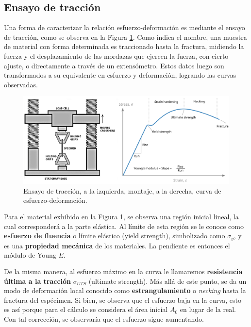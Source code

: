\subsection{Ensayo de tracción}

Una forma de caracterizar la relación esfuerzo-deformación es mediante el ensayo de tracción, como se observa en la Figura \ref{fig:2}. Como indica el nombre, una muestra de material con forma determinada es traccionado hasta la fractura, midiendo la fuerza y el desplazamiento de las mordazas que ejercen la fuerza, con cierto ajuste, o directamente a través de un extensómetro. Estos datos luego son transformados a su equivalente en esfuerzo y deformación, logrando las curvas observadas. 

\begin{figure}[h!]
    \centering
    \includegraphics[width=0.92\linewidth]{imgs/es1.png}
    \caption{Ensayo de tracción, a la izquierda, montaje, a la derecha, curva de esfuerzo-deformación.}
    \label{fig:2}
\end{figure}

Para el material exhibido en la Figura \ref{fig:2}, se observa una región inicial lineal, la cual corresponderá a la parte elástica. Al límite de esta región se le conoce como \textbf{esfuerzo de fluencia} o límite elástico (yield strength), simbolizado como $\sigma_{y}$, y es una \textbf{propiedad mecánica} de los materiales. La pendiente es entonces el módulo de Young $E$.

De la misma manera, al esfuerzo máximo en la curva le llamaremos \textbf{resistencia última a la tracción} $\sigma_{UTS}$ (ultimate strength). Más allá de este punto, se da un modo de deformación local conocido como \textbf{estrangulamiento} o \textit{necking} hasta la fractura del espécimen. Si bien, se observa que el esfuerzo baja en la curva, esto es así porque para el cálculo se considera el área inicial $A_{0}$ en lugar de la real. Con tal corrección, se observaría que el esfuerzo sigue aumentando.

